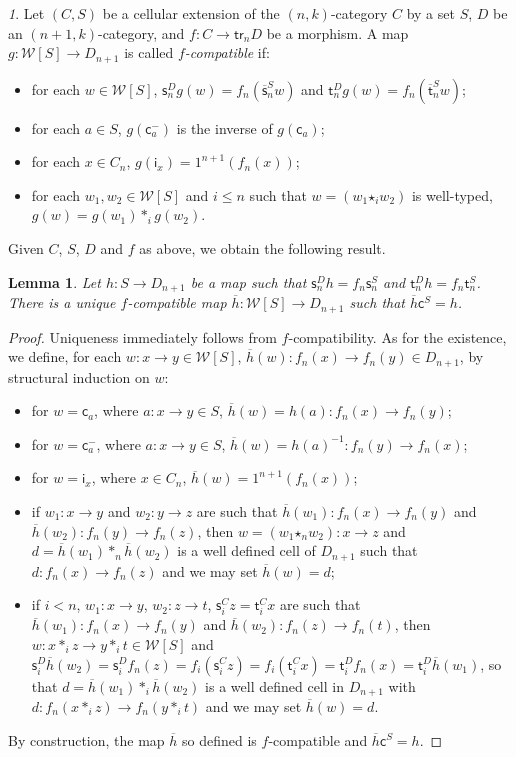 \documentclass[reqno]{amsart}
\theoremstyle{plain}
\newtheorem{lemma}[subsubsection]{Lemma}
\theoremstyle{definition}
\theoremstyle{remark}
\newtheorem{paragr}[subsubsection]{} %
\newcommand{\pair}[2]{(#1,#2)}       %
\newcommand{\source}{\mathsf{s}} %
\newcommand{\target}{\mathsf{t}} %
\newcommand{\unit}[1]{1^{#1}} %
\newcommand{\functor}[1]{\mathsf{#1}} %
\newcommand{\trk}[1]{\functor{tr}_{#1}}%
\newcommand{\comp}[1]{\ast_{#1}} %
\newcommand{\sce}[1]{\source_{#1}} %
\newcommand{\tge}[1]{\target_{#1}} %
\newcommand{\inv}[1]{{#1}^{-1}} %
\newcommand{\clx}[2]{\pair{#1}{#2}}%
\newcommand{\WW}{\mathcal{W}}
\newcommand{\wtx}[1]{\WW[#1]} %
\newcommand{\formal}[1]{\mathsf{#1}} %
\newcommand{\fcst}[1]{\formal{c}_{#1}} %
\newcommand{\finv}[1]{\formal{c}^{\boldsymbol{-}}_{#1}}%
\newcommand{\fid}[1]{\formal{i}_{#1}} %
\newcommand{\fcomp}[1]{\bm{\star}_{#1}} %
\newcommand{\finc}[1]{\formal{c}^{#1}}%
\newcommand{\scex}[1]{\extend{\source}_{#1}}
\newcommand{\tgex}[1]{\extend{\target}_{#1}}
\newcommand{\extend}[1]{\overline{#1}} %
\begin{document}
 \begin{paragr}
   Let $\clx CS$ be a cellular extension of the $\pair nk$-category
   $C$ by a set $S$, $D$ be an $\pair{n{+}1}k$-category, and $f:C\to \trk n
   D$ be a morphism. A map $g:\wtx S\to D_{n+1}$ is called {\em $f$-compatible} if:
   \begin{itemize}
   \item for each $w\in\wtx S$, $\sce n^Dg(w)=f_n(\scex n^S w)$ and
     $\tge n^D g(w)=f_n(\tgex n^S w)$;
    \item for each $a\in S$, $g(\finv a)$ is the inverse of $g(\fcst
      a)$;
    \item for each $x\in C_n$, $g(\fid x)=\unit{n+1}(f_n(x))$;
    \item for each $w_1,w_2\in\wtx S$ and $i\leq n$ such that
      $w=(w_1\fcomp i w_2)$ is well-typed, $g(w)=g(w_1)\comp i g(w_2)$.  
    \end{itemize}
    Given $C$, $S$, $D$ and $f$ as above, we obtain the following result.
  \end{paragr}
  \begin{lemma}\label{lemma:mapext}
    Let $h:S\to D_{n+1}$ be a map such that $\sce n^Dh=f_n \sce
    n^S$ and $\tge n^Dh=f_{n} \tge n^S$. There is a unique
    $f$-compatible map
    $\extend h:\wtx S\to D_{n+1}$
    such that $\extend h\finc S=h$.
  \end{lemma}
  \begin{proof}
    Uniqueness immediately follows from $f$-compatibility. As for the
    existence, we define, for each $w:x\to y\in\wtx S$,
  $\extend h(w):f_n(x)\to f_n(y)\in D_{n+1}$, by structural induction
  on $w$:
  \begin{itemize}
  \item for $w=\fcst a$, where $a:x\to y\in S$, $\extend
    h(w)=h(a):f_n(x)\to f_n(y)$;
  \item for $w=\finv a$, where $a:x\to y\in S$, $\extend
    h(w)=\inv{h(a)}:f_n(y)\to f_n(x)$;
  \item for $w=\fid x$, where $x\in C_n$, $\extend
    h(w)=\unit{n+1}(f_n(x))$;
  \item if $w_1:x\to y$ and $w_2:y\to z$ are such that $\extend
    h(w_1):f_n(x)\to f_n(y)$ and $\extend h(w_2):f_n(y)\to f_n(z)$,
    then $w=(w_1\fcomp n w_2):x\to z$ and $d=\extend h(w_1)\comp
    n\extend h(w_2)$ is a well defined cell of $D_{n+1}$ such that
    $d:f_n(x)\to f_n(z)$ and we may set $\extend h(w)=d$;
  \item if $i<n$, $w_1:x\to y$, $w_2:z\to t$, $\sce i^Cz=\tge i^Cx $
    are such that $\extend h(w_1):f_n(x)\to f_n(y)$ and
    $\extend h(w_2):f_n(z)\to f_n(t)$, then
    $w:x\comp i z\to y\comp i t\in \wtx S$ and $\sce i^D\extend
    h(w_2)=\sce i^Df_n(z)=f_i(\sce i^Cz)=f_i(\tge i^Cx)=\tge
    i^Df_n(x)=\tge i^D\extend h(w_1)$, so that $d=\extend h(w_1)\comp
    i\extend h(w_2)$ is a well defined cell in $D_{n+1}$ with
    $d:f_n(x\comp i z)\to f_n(y\comp i t)$ and we may set $\extend h(w)=d$.
  \end{itemize}
  By construction, the map $\extend h$ so defined is $f$-compatible
  and $\extend h\finc S =h$.
  \end{proof}
  
\end{document}
